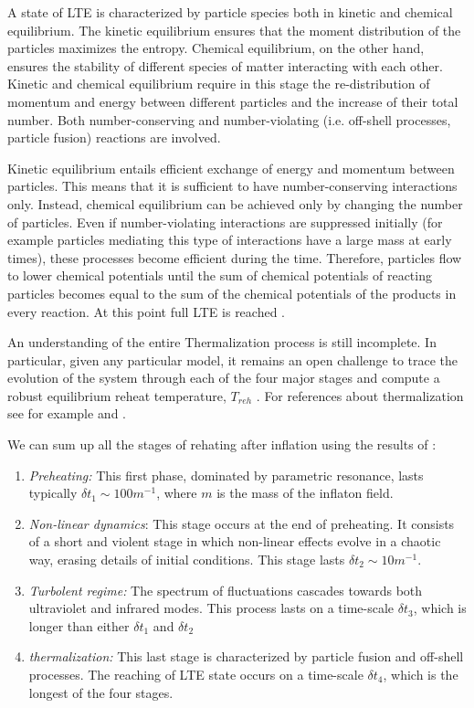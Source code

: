 \documentclass[11pt,a4paper,twoside]{book}
\begin{document}
A state of LTE is characterized by particle species both in kinetic and chemical equilibrium. The kinetic equilibrium ensures that the moment distribution of the particles maximizes the entropy. Chemical equilibrium, on the other hand,  ensures the stability of different species of matter interacting with each other. Kinetic and chemical equilibrium require in this stage the re-distribution of momentum and energy between different particles and the increase of their total number. Both number-conserving and number-violating (i.e. off-shell processes, particle fusion) reactions are involved.

Kinetic equilibrium entails efficient exchange of energy and momentum between particles. This means that it is sufficient to have number-conserving interactions only. Instead, chemical equilibrium can be achieved only by changing the number of particles. Even if number-violating interactions are suppressed initially (for example particles mediating this type of interactions have a large mass at early times), these processes become efficient during the time.  Therefore, particles flow to lower chemical potentials until the sum of chemical potentials of reacting particles becomes equal to the sum of the chemical potentials of the products in every reaction. At this point full LTE is reached \cite{Chap4:Lozanov}.

An understanding of the entire Thermalization process is still incomplete. In particular, given any particular model, it remains an open challenge to trace the evolution of the system through each of the four major stages and compute a robust equilibrium reheat temperature, $ T_{reh} $ \cite{Chap4:AminHetrzberg}. For references about thermalization see for example \cite{Chap4:AminHetrzberg} and \cite{Chap4:Lozanov}.

We can sum up all the stages of rehating after inflation using the results of \cite{Chap7:Peloso_thermalization}:
\begin{enumerate}
	\item \textit{Preheating:} This first phase, dominated by parametric resonance, lasts typically $\delta t_{1} \sim 100 m^{-1}$, where $ m $ is the mass of the inflaton field.
	
	\item \textit{Non-linear dynamics}: This stage occurs at the end of preheating. It consists of a short and violent stage in which non-linear effects evolve in a chaotic way, erasing details of initial conditions. This stage lasts $ \delta t_{2} \sim 1 0m^{-1} $.
	
	\item \textit{Turbolent regime:} The spectrum of fluctuations cascades towards both ultraviolet and infrared modes. This process lasts on a time-scale $\delta t_{3}$, which is longer than either $\delta t_{1}$ and $ \delta t_{2} $
	
	\item \textit{thermalization:} This last stage is characterized by particle fusion and off-shell processes. The reaching of LTE state occurs on a time-scale $\delta t_{4}$, which is the longest of the four stages.  
\end{enumerate}
\end{document}
